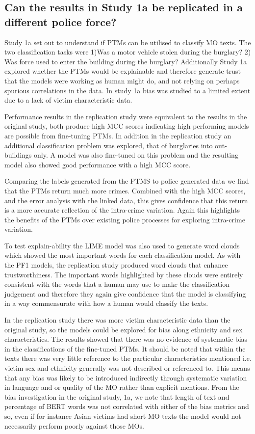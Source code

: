 \subsection{Can the results in Study 1a be replicated in a different police force?}Study 1a set out to understand if PTMs can be utilised to classify MO texts. The two classification tasks were 1)Was a motor vehicle stolen during the burglary? 2) Was force used to enter the building during the burglary?  Additionally Study 1a explored whether the PTMs would be explainable and therefore generate trust that the models were working as human might do, and not relying on perhaps spurious correlations in the data. In study 1a bias was studied to a limited extent due to a lack of victim characteristic data.

Performance results in the replication study were equivalent to the results in the original study, both produce high MCC scores indicating high performing models are possible from fine-tuning PTMs. In addition in the replication study an additional classification problem was explored, that of burglaries into out-buildings only. A model was also fine-tuned on this problem and the resulting model also showed good performance with a high MCC score.

Comparing the labels generated from the PTMS to police generated data we find that the PTMs return much more crimes. Combined with the high MCC scores, and the error analysis with the linked data, this gives confidence that this return is a more accurate reflection of the intra-crime variation. Again this highlights the benefits of the PTMs over existing police processes for exploring intra-crime variation. 

To test explain-ability the LIME model was also used to generate word clouds which showed the most important words for each classification model. As with the PF1 models, the replication study produced word clouds that enhance trustworthiness. The important words highlighted by these clouds were entirely consistent with the words that a human may use to make the classification judgement and therefore they again give confidence that the model is classifying in a way commensurate with how a human would classify the texts.

In the replication study there was more victim characteristic data than the original study, so the models could be explored for bias along ethnicity and sex characteristics. The results showed that there was no evidence of systematic bias in the classifications of the fine-tuned PTMs. It should be noted that within the texts there was very little reference to the particular characteristics mentioned i.e. victim sex and ethnicity generally was not described or referenced to. This means that any bias was likely to be introduced indirectly through systematic variation in language and or quality of the MO rather than explicit mentions. From the bias investigation in the original study, 1a,  we note that length of text and percentage of BERT words was not correlated with either of the bias metrics and so, even if for instance Asian victims had short MO texts the model would not necessarily perform poorly against those MOs. 


